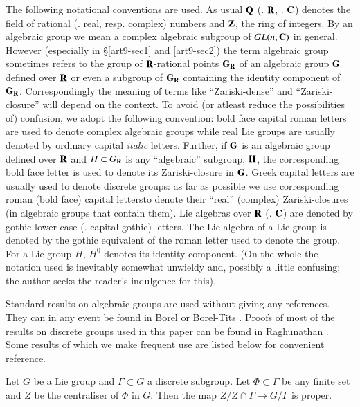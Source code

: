 The following notational conventions are used.  As usual $\mathbf{Q}$ (\resp. $\mathbf{R}$, \resp. $\mathbf{C}$) denotes the field of rational (\resp. real, resp. complex) numbers and $\mathbf{Z}$, the ring of integers. By an algebraic group we mean a complex algebraic subgroup of $GL(n, \mathbf{C})$ in general. However (especially in \S \ref{art9-sec1} and \ref{art9-sec2}) the term algebraic group sometimes refers to the group of $\mathbf{R}$-rational points $\mathbf{G}_{\mathbf{R}}$ of an algebraic group $\mathbf{G}$ defined over $\mathbf{R}$ or even a subgroup of $\mathbf{G}_{\mathbf{R}}$ containing the identity component of $\mathbf{G}_{\mathbf{R}}$. Correspondingly the meaning of terms like ``Zariski-dense'' and ``Zariski-closure'' will depend on the context. To avoid (or atleast reduce the possibilities of) confusion, we adopt the following convention: bold face capital roman letters are used to denote complex algebraic groups while real Lie groups are usually denoted by ordinary capital \textit{italic} letters. Further, if $\mathbf{G}$ is an algebraic group defined over $\mathbf{R}$ and $H \subset G_{\mathbf{R}}$ is any ``algebraic'' subgroup, $\mathbf{H}$, the corresponding bold face letter is used to denote its Zariski-closure in $\mathbf{G}$. Greek capital letters are usually used to denote discrete groups: as far as possible we use corresponding roman (bold face) capital letters\pageoriginale  to denote their ``real'' (complex) Zariski-closures (in algebraic groups that contain them). Lie algebras over $\mathbf{R}$ (\resp. $\mathbf{C}$) are denoted by gothic lower case (\resp. capital gothic) letters. The Lie algebra of a Lie group is denoted by the gothic equivalent of the roman letter used to denote the group. For a Lie group $H$, $H^0$ denotes its identity component. (On the whole the notation used is inevitably somewhat unwieldy and, possibly a little confusing; the author seeks the reader's indulgence for this).

Standard results on algebraic groups are used without giving any references. They can in any event be found in Borel \cite{art9-key3} or Borel-Tits \cite{art9-key2}. Proofs of most of the results on discrete groups used in this paper can be found in Raghunathan \cite{art9-key1}. Some results of which we make frequent use are listed below for convenient reference.

\begin{romanlemma}\label{art9-romanlem1}
Let $G$ be a Lie group and $\Gamma \subset G$ a discrete subgroup. Let $\Phi \subset \Gamma$ be any finite set and $Z$ be the centraliser of $\Phi$ in $G$. Then the map $Z/ Z \cap \Gamma \to G/ \Gamma$ is proper.
\end{romanlemma}

